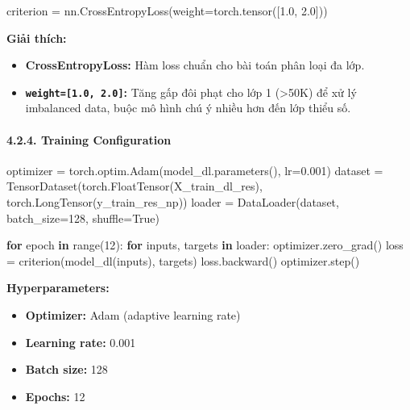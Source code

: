 \documentclass[
]{article}
\newenvironment{Shaded}{}{}
\newcommand{\BuiltInTok}[1]{\textcolor[rgb]{0.00,0.50,0.00}{#1}}
\newcommand{\ControlFlowTok}[1]{\textcolor[rgb]{0.00,0.44,0.13}{\textbf{#1}}}
\newcommand{\DecValTok}[1]{\textcolor[rgb]{0.25,0.63,0.44}{#1}}
\newcommand{\FloatTok}[1]{\textcolor[rgb]{0.25,0.63,0.44}{#1}}
\newcommand{\KeywordTok}[1]{\textcolor[rgb]{0.00,0.44,0.13}{\textbf{#1}}}
\newcommand{\NormalTok}[1]{#1}
\newcommand{\OperatorTok}[1]{\textcolor[rgb]{0.40,0.40,0.40}{#1}}
\newcommand{\VariableTok}[1]{\textcolor[rgb]{0.10,0.09,0.49}{#1}}
\providecommand{\tightlist}{%
  \setlength{\itemsep}{0pt}\setlength{\parskip}{0pt}}
\begin{document}
\begin{Shaded}
\begin{Highlighting}[]
\NormalTok{criterion }\OperatorTok{=}\NormalTok{ nn.CrossEntropyLoss(weight}\OperatorTok{=}\NormalTok{torch.tensor([}\FloatTok{1.0}\NormalTok{, }\FloatTok{2.0}\NormalTok{]))}
\end{Highlighting}
\end{Shaded}

\textbf{Giải thích:}

\begin{itemize}
\tightlist
\item
  \textbf{CrossEntropyLoss:} Hàm loss chuẩn cho bài toán phân loại đa
  lớp.
\item
  \textbf{\texttt{weight={[}1.0,\ 2.0{]}}:} Tăng gấp đôi phạt cho lớp 1
  (\textgreater50K) để xử lý imbalanced data, buộc mô hình chú ý nhiều
  hơn đến lớp thiểu số.
\end{itemize}

\paragraph{4.2.4. Training
Configuration}\label{424-training-configuration}

\begin{Shaded}
\begin{Highlighting}[]
\NormalTok{optimizer }\OperatorTok{=}\NormalTok{ torch.optim.Adam(model\_dl.parameters(), lr}\OperatorTok{=}\FloatTok{0.001}\NormalTok{)}
\NormalTok{dataset }\OperatorTok{=}\NormalTok{ TensorDataset(torch.FloatTensor(X\_train\_dl\_res), torch.LongTensor(y\_train\_res\_np))}
\NormalTok{loader }\OperatorTok{=}\NormalTok{ DataLoader(dataset, batch\_size}\OperatorTok{=}\DecValTok{128}\NormalTok{, shuffle}\OperatorTok{=}\VariableTok{True}\NormalTok{)}

\ControlFlowTok{for}\NormalTok{ epoch }\KeywordTok{in} \BuiltInTok{range}\NormalTok{(}\DecValTok{12}\NormalTok{):}
    \ControlFlowTok{for}\NormalTok{ inputs, targets }\KeywordTok{in}\NormalTok{ loader:}
\NormalTok{        optimizer.zero\_grad()}
\NormalTok{        loss }\OperatorTok{=}\NormalTok{ criterion(model\_dl(inputs), targets)}
\NormalTok{        loss.backward()}
\NormalTok{        optimizer.step()}
\end{Highlighting}
\end{Shaded}

\textbf{Hyperparameters:}

\begin{itemize}
\tightlist
\item
  \textbf{Optimizer:} Adam (adaptive learning rate)
\item
  \textbf{Learning rate:} 0.001
\item
  \textbf{Batch size:} 128
\item
  \textbf{Epochs:} 12
\end{itemize}
\end{document}
